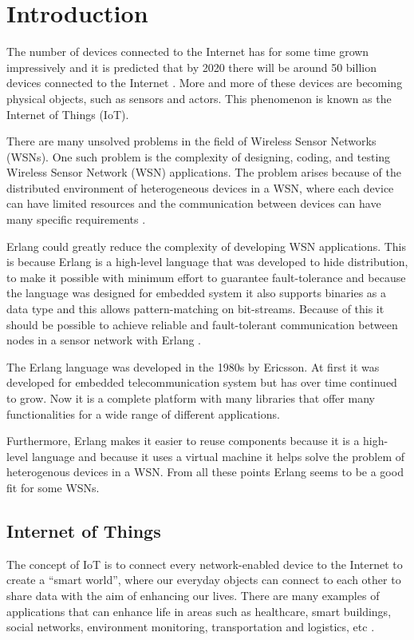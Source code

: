 \chapter{Introduction}
The number of devices connected to the Internet has for some time grown impressively and it is predicted that by 2020 there will be around 50 billion devices connected to the Internet \citep{BELLO201752}.  More and more of these devices are becoming physical objects, such as sensors and actors. This phenomenon is known as the Internet of Things (IoT).

There are many unsolved problems in the field of Wireless Sensor Networks (WSNs). One such problem is the complexity of designing, coding, and testing Wireless Sensor Network (WSN) applications. The problem arises because of the distributed environment of heterogeneous devices in a WSN, where each device can have limited resources and the communication between devices can have many specific requirements \citep{sivieri2012wsn}.

 Erlang could greatly reduce the complexity of developing WSN applications. This is because Erlang is a high-level language that was developed to hide distribution, to make it possible with minimum effort to guarantee fault-tolerance and because the language was designed for embedded system it also supports binaries as a data type and this allows pattern-matching on bit-streams. Because of this it should be possible to achieve reliable and fault-tolerant communication between nodes in a sensor network with Erlang \citep{sivieri2012erlang}.

The Erlang language was developed in the 1980s by Ericsson. At first it was developed for embedded telecommunication system but has over time continued to grow. Now it is a complete platform with many libraries that offer many functionalities for a wide range of different applications. 

Furthermore, Erlang makes it easier to reuse components because it is a high-level language and because it uses a virtual machine it helps solve the problem of heterogenous devices in a WSN. From all these points Erlang seems to be a good fit for some WSNs.

\section{Internet of Things}\label{sec:intro_iot}
The concept of IoT is to connect every network-enabled device to the Internet to create a “smart world”, where our everyday objects can connect to each other to share data with the aim of enhancing our lives. There are many examples of applications that can enhance life in areas such as healthcare, smart buildings, social networks, environment monitoring, transportation and logistics, etc \citep{yang2014internet}.

